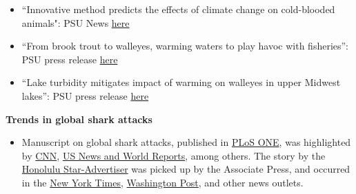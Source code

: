 \documentclass[10pt]{article}
\begin{document}
\begin{flushleft}
\begin{itemize}
	\item ``Innovative method predicts the effects of climate change on cold-blooded animals": PSU News \href{https://www.psu.edu/news/research/story/innovative-method-predicts-effects-climate-change-cold-blooded-animals/}{here}\\
	
	\item ``From brook trout to walleyes, warming waters to play havoc with fisheries'': PSU press release \href{http://news.psu.edu/story/470451/2017/06/04/research/brook-trout-walleyes-warming-waters-play-havoc-fisheries}{here}\\
	\vspace{5pt}
	
	\item ``Lake turbidity mitigates impact of warming on walleyes in upper Midwest lakes'': PSU press release \href{https://news.psu.edu/story/649107/2021/02/26/research/lake-turbidity-mitigates-impact-warming-walleyes-upper-midwest}{here}\\
\end{itemize}

\textbf{Trends in global shark attacks}\\
\begin{itemize}
	\item Manuscript on global shark attacks, published in \href{https://journals.plos.org/plosone/article?id=10.1371/journal.pone.0211049}{PLoS ONE}, was highlighted by \href{https://www.cnn.com/2019/02/27/health/shark-attack-risk-low-study/index.html}{CNN},  
	\href{https://www.usnews.com/news/health-news/articles/2019-02-27/dont-fear-shark-attacks-remain-rare
	}{US News and World Reports}, among others. The story by the 
  \href{https://www.staradvertiser.com/2019/03/01/hawaii-news/shark-attacks-up-but-risk-still-low/?HSA=02820a85be106052a2a700de45e8b4dd77e64a75}{Honolulu Star-Advertiser}
was picked up by the Associate Press, and occurred in the 
\href{https://www.nytimes.com/aponline/2019/03/02/us/ap-us-shark-bite-study.html}{New York Times}, \href{https://www.washingtonpost.com/national/health-science/study-more-sharks-bite-people-in-hawaii-but-risk-minuscule/2019/03/02/50c79b92-3d55-11e9-b10b-f05a22e75865_story.html?noredirect=on&utm_term=.2d98167dde7b}{Washington Post}, and other news outlets.
\end{itemize}


\end{flushleft}
\end{document}
